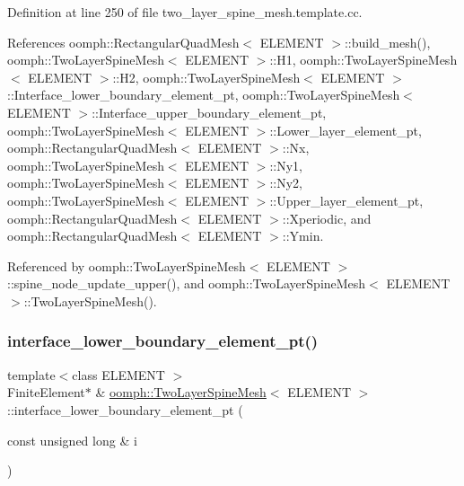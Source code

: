Definition at line 250 of file two\+\_\+layer\+\_\+spine\+\_\+mesh.\+template.\+cc.



References oomph\+::\+Rectangular\+Quad\+Mesh$<$ E\+L\+E\+M\+E\+N\+T $>$\+::build\+\_\+mesh(), oomph\+::\+Two\+Layer\+Spine\+Mesh$<$ E\+L\+E\+M\+E\+N\+T $>$\+::\+H1, oomph\+::\+Two\+Layer\+Spine\+Mesh$<$ E\+L\+E\+M\+E\+N\+T $>$\+::\+H2, oomph\+::\+Two\+Layer\+Spine\+Mesh$<$ E\+L\+E\+M\+E\+N\+T $>$\+::\+Interface\+\_\+lower\+\_\+boundary\+\_\+element\+\_\+pt, oomph\+::\+Two\+Layer\+Spine\+Mesh$<$ E\+L\+E\+M\+E\+N\+T $>$\+::\+Interface\+\_\+upper\+\_\+boundary\+\_\+element\+\_\+pt, oomph\+::\+Two\+Layer\+Spine\+Mesh$<$ E\+L\+E\+M\+E\+N\+T $>$\+::\+Lower\+\_\+layer\+\_\+element\+\_\+pt, oomph\+::\+Rectangular\+Quad\+Mesh$<$ E\+L\+E\+M\+E\+N\+T $>$\+::\+Nx, oomph\+::\+Two\+Layer\+Spine\+Mesh$<$ E\+L\+E\+M\+E\+N\+T $>$\+::\+Ny1, oomph\+::\+Two\+Layer\+Spine\+Mesh$<$ E\+L\+E\+M\+E\+N\+T $>$\+::\+Ny2, oomph\+::\+Two\+Layer\+Spine\+Mesh$<$ E\+L\+E\+M\+E\+N\+T $>$\+::\+Upper\+\_\+layer\+\_\+element\+\_\+pt, oomph\+::\+Rectangular\+Quad\+Mesh$<$ E\+L\+E\+M\+E\+N\+T $>$\+::\+Xperiodic, and oomph\+::\+Rectangular\+Quad\+Mesh$<$ E\+L\+E\+M\+E\+N\+T $>$\+::\+Ymin.



Referenced by oomph\+::\+Two\+Layer\+Spine\+Mesh$<$ E\+L\+E\+M\+E\+N\+T $>$\+::spine\+\_\+node\+\_\+update\+\_\+upper(), and oomph\+::\+Two\+Layer\+Spine\+Mesh$<$ E\+L\+E\+M\+E\+N\+T $>$\+::\+Two\+Layer\+Spine\+Mesh().

\mbox{\label{classoomph_1_1TwoLayerSpineMesh_a190b41082ad3d8c25c5d3d07040b8933}} 
\subsubsection{\texorpdfstring{interface\+\_\+lower\+\_\+boundary\+\_\+element\+\_\+pt()}{interface\_lower\_boundary\_element\_pt()}}
{\footnotesize\ttfamily template$<$class E\+L\+E\+M\+E\+NT $>$ \\
Finite\+Element$\ast$ \& \hyperlink{classoomph_1_1TwoLayerSpineMesh}{oomph\+::\+Two\+Layer\+Spine\+Mesh}$<$ E\+L\+E\+M\+E\+NT $>$\+::interface\+\_\+lower\+\_\+boundary\+\_\+element\+\_\+pt (\begin{DoxyParamCaption}\item[{const unsigned long \&}]{i }\end{DoxyParamCaption})\hspace{0.3cm}{\ttfamily [inline]}}



